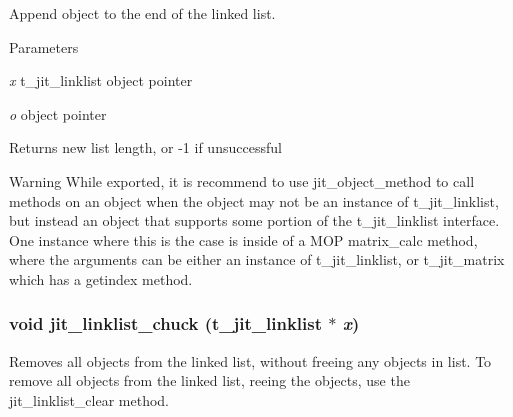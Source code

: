 Append object to the end of the linked list. 
\begin{DoxyParams}{Parameters}
\item[{\em x}]t\_\-jit\_\-linklist object pointer \item[{\em o}]object pointer\end{DoxyParams}
\begin{DoxyReturn}{Returns}
new list length, or -\/1 if unsuccessful
\end{DoxyReturn}
\begin{DoxyWarning}{Warning}
While exported, it is recommend to use jit\_\-object\_\-method to call methods on an object when the object may not be an instance of t\_\-jit\_\-linklist, but instead an object that supports some portion of the t\_\-jit\_\-linklist interface. One instance where this is the case is inside of a MOP matrix\_\-calc method, where the arguments can be either an instance of t\_\-jit\_\-linklist, or t\_\-jit\_\-matrix which has a getindex method. 
\end{DoxyWarning}
\hypertarget{group__linklistmod_gaba0236de39f684e338ae6bf5736ae4ad}{
\subsubsection[{jit\_\-linklist\_\-chuck}]{\setlength{\rightskip}{0pt plus 5cm}void jit\_\-linklist\_\-chuck (t\_\-jit\_\-linklist $\ast$ {\em x})}}
\label{group__linklistmod_gaba0236de39f684e338ae6bf5736ae4ad}


Removes all objects from the linked list, without freeing any objects in list. To remove all objects from the linked list, reeing the objects, use the jit\_\-linklist\_\-clear method.


